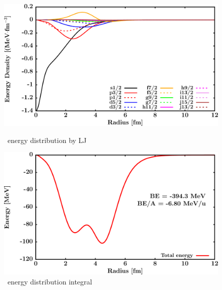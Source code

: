 \begin{figure}[hbtp]
    \centering
    \begin{minipage}{0.45\textwidth}
        \centering
        \includegraphics[width=\textwidth]{figures/ni58_EnergyDist.png}
        \caption*{\niEight\ energy distribution by LJ}
        \label{DOMFitData_ni58_proton_energyDistInt}
    \end{minipage}\hspace{6pt}
    \begin{minipage}{0.45\textwidth}
        \centering
        \includegraphics[width=\textwidth]{figures/ni58_EnergyDistIntegral.png}
        \caption*{\niEight\ energy distribution integral}
        \label{DOMFitData_ni58_neutron_energyDistInt}
    \end{minipage}
\end{figure}
\vspace{0.4in}
